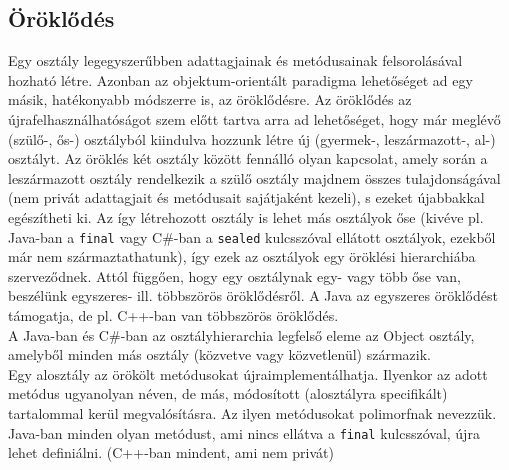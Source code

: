 \documentclass[12pt,margin=0px]{article}
\begin{document}
	\subsection{Öröklődés}
	
    Egy osztály legegyszerűbben adattagjainak és metódusainak felsorolásával hozható létre. Azonban az objektum-orientált paradigma lehetőséget ad egy másik, hatékonyabb módszerre is, az öröklődésre. Az öröklődés az újrafelhasználhatóságot szem előtt tartva arra ad lehetőséget, hogy már meglévő (szülő-, ős-) osztályból kiindulva hozzunk létre új (gyermek-, leszármazott-, al-) osztályt. Az öröklés két osztály között fennálló olyan kapcsolat, amely során a leszármazott osztály rendelkezik a szülő osztály majdnem összes tulajdonságával (nem privát adattagjait és metódusait sajátjaként kezeli), s ezeket újabbakkal egészítheti ki. Az így létrehozott osztály is lehet más osztályok őse (kivéve pl. Java-ban a \texttt{final} vagy C\#-ban a \texttt{sealed} kulcsszóval ellátott osztályok, ezekből már nem származtathatunk), így ezek az osztályok egy öröklési hierarchiába szerveződnek. Attól függően, hogy egy osztálynak egy- vagy több őse van, beszélünk egyszeres- ill. többszörös öröklődésről. A Java az egyszeres öröklődést támogatja, de pl. C++-ban van többszörös öröklődés.\\
	
    \noindent A Java-ban és C\#-ban az osztályhierarchia legfelső eleme az Object osztály, amelyből minden más osztály (közvetve vagy közvetlenül) származik.\\
	
    \noindent Egy alosztály az örökölt metódusokat újraimplementálhatja. Ilyenkor az adott metódus ugyanolyan néven, de más, módosított (alosztályra specifikált) tartalommal kerül megvalósításra. Az ilyen metódusokat polimorfnak nevezzük. Java-ban minden olyan metódust, ami nincs ellátva a \texttt{final} kulcsszóval, újra lehet definiálni. (C++-ban mindent, ami nem privát)\\
	
\end{document}
